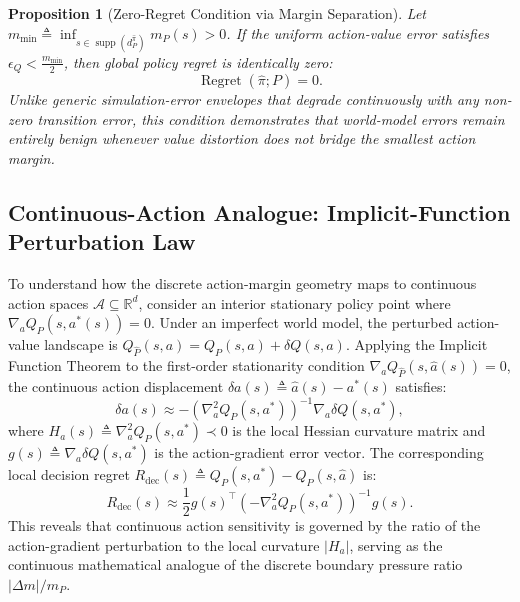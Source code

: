 \documentclass[journal,10pt,twocolumn]{IEEEtran}
\newtheorem{proposition}{Proposition}
\begin{document}
\begin{proposition}[Zero-Regret Condition via Margin Separation]
\label{prop:simulation_lemma_comparison}
Let $m_{\min} \triangleq \inf_{s \in \operatorname{supp}(d_P^{\hat{\pi}})} m_P(s) > 0$. If the uniform action-value error satisfies $\epsilon_Q < \frac{m_{\min}}{2}$, then global policy regret is identically zero:
\begin{equation}
\operatorname{Regret}(\hat{\pi}; P) = 0.
\label{eq:zero_regret_prop}
\end{equation}
Unlike generic simulation-error envelopes that degrade continuously with any non-zero transition error, this condition demonstrates that world-model errors remain entirely benign whenever value distortion does not bridge the smallest action margin.
\end{proposition}

\subsection{Continuous-Action Analogue: Implicit-Function Perturbation Law}
\label{subsec:continuous_action_analogue}

To understand how the discrete action-margin geometry maps to continuous action spaces $\mathcal{A} \subseteq \mathbb{R}^d$, consider an interior stationary policy point where $\nabla_a Q_P(s, a^*(s)) = 0$. Under an imperfect world model, the perturbed action-value landscape is $Q_{\hat{P}}(s, a) = Q_P(s, a) + \delta Q(s, a)$.
Applying the Implicit Function Theorem to the first-order stationarity condition $\nabla_a Q_{\hat{P}}(s, \hat{a}(s)) = 0$, the continuous action displacement $\delta a(s) \triangleq \hat{a}(s) - a^*(s)$ satisfies:
\begin{equation}
\delta a(s) \approx - \left( \nabla_a^2 Q_P(s, a^*) \right)^{-1} \nabla_a \delta Q(s, a^*),
\label{eq:implicit_perturbation_law}
\end{equation}
where $H_a(s) \triangleq \nabla_a^2 Q_P(s, a^*) \prec 0$ is the local Hessian curvature matrix and $g(s) \triangleq \nabla_a \delta Q(s, a^*)$ is the action-gradient error vector. The corresponding local decision regret $R_{\mathrm{dec}}(s) \triangleq Q_P(s, a^*) - Q_P(s, \hat{a})$ is:
\begin{equation}
R_{\mathrm{dec}}(s) \approx \frac{1}{2} g(s)^\top \left( - \nabla_a^2 Q_P(s, a^*) \right)^{-1} g(s).
\label{eq:continuous_regret_hessian}
\end{equation}
This reveals that continuous action sensitivity is governed by the ratio of the action-gradient perturbation to the local curvature $|H_a|$, serving as the continuous mathematical analogue of the discrete boundary pressure ratio $|\Delta m| / m_P$.
\end{document}
